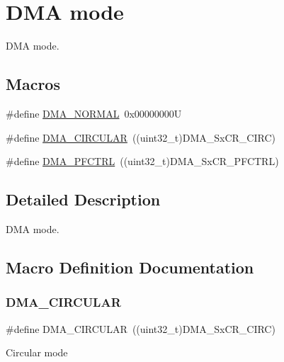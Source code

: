 \hypertarget{group___d_m_a__mode}{}\section{D\+MA mode}
\label{group___d_m_a__mode}


D\+MA mode.  


\subsection*{Macros}
\begin{DoxyCompactItemize}
\item 
\#define \hyperlink{group___d_m_a__mode_ga04941acfbbdefc53e1e08133cffa3b8a}{D\+M\+A\+\_\+\+N\+O\+R\+M\+AL}~0x00000000U
\item 
\#define \hyperlink{group___d_m_a__mode_ga4c4f425cba13edffb3c831c036c91e01}{D\+M\+A\+\_\+\+C\+I\+R\+C\+U\+L\+AR}~((uint32\+\_\+t)D\+M\+A\+\_\+\+Sx\+C\+R\+\_\+\+C\+I\+RC)
\item 
\#define \hyperlink{group___d_m_a__mode_ga7974ee645c8e275a2297cf37eec9e022}{D\+M\+A\+\_\+\+P\+F\+C\+T\+RL}~((uint32\+\_\+t)D\+M\+A\+\_\+\+Sx\+C\+R\+\_\+\+P\+F\+C\+T\+RL)
\end{DoxyCompactItemize}


\subsection{Detailed Description}
D\+MA mode. 



\subsection{Macro Definition Documentation}
\mbox{\label{group___d_m_a__mode_ga4c4f425cba13edffb3c831c036c91e01}} 
\subsubsection{\texorpdfstring{D\+M\+A\+\_\+\+C\+I\+R\+C\+U\+L\+AR}{DMA\_CIRCULAR}}
{\footnotesize\ttfamily \#define D\+M\+A\+\_\+\+C\+I\+R\+C\+U\+L\+AR~((uint32\+\_\+t)D\+M\+A\+\_\+\+Sx\+C\+R\+\_\+\+C\+I\+RC)}

Circular mode \mbox{\label{group___d_m_a__mode_ga04941acfbbdefc53e1e08133cffa3b8a}} 
